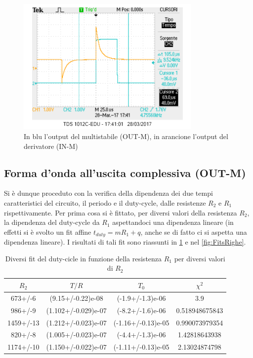 \documentclass[a4paper,10pt]{article}
\begin{document}
\begin{figure}[H]
	\centering
	\includegraphics[width=0.8\textwidth]{../grafici/4InMOutM.png}
	\caption{In blu l'output del multistabile (OUT-M), in arancione l'output del derivatore (IN-M)}
	\label{fig:InMOutM}
\end{figure}

\pagebreak[1]
\subsection{Forma d'onda all'uscita complessiva (OUT-M)}

Si è dunque proceduto con la verifica della dipendenza dei due tempi caratteristici del circuito, il periodo e il duty-cycle, dalle resistenze $R_2$ e $R_1$ rispettivamente. Per prima cosa si è fittato, per diversi valori della resistenza $R_2$, la dipendenza del duty-cycle da $R_1$ aspettandoci una dipendenza lineare (in effetti si è svolto un fit affine $t_{duty}=mR_1+q$, anche se di fatto ci si aspetta una dipendenza lineare). I risultati di tali fit sono riassunti in \cref{tab:DutyFit} e nel \cref{fig:FitsRighe}. 

\begin{table}[H]
\centering
\begin{tabular}{c|c|c|c} 
$R_2$ & $T/R$ & $T_0$ & $\chi^2$\\
\hline
673+/-6 & (9.15+/-0.22)e-08 & (-1.9+/-1.3)e-06 & 3.9\\
986+/-9 & (1.102+/-0.029)e-07 & (-8.2+/-1.6)e-06 & 0.518948675843\\
1459+/-13 & (1.212+/-0.023)e-07 & (-1.16+/-0.13)e-05 & 0.990073979354\\
820+/-8 & (1.005+/-0.023)e-07 & (-4.4+/-1.3)e-06 & 1.42818643938\\
1174+/-10 & (1.150+/-0.022)e-07 & (-1.11+/-0.13)e-05 & 2.13024874798\\
\end{tabular}
\caption{Diversi fit del duty-cicle in funzione della resistenza $R_1$ per diversi valori di $R_2$}
\label{tab:DutyFit}
\end{table}
\end{document}
